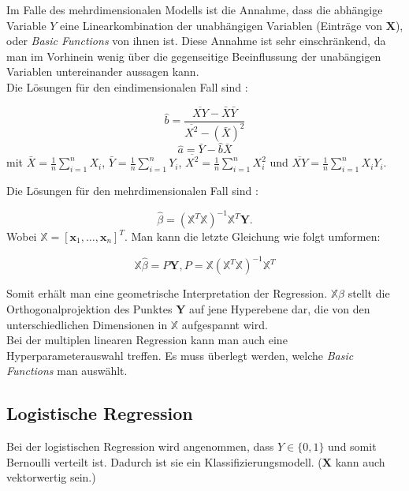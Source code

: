 Im Falle des mehrdimensionalen Modells ist die Annahme, dass die \glqq abh\"angige\grqq{} Variable $Y$ eine Linearkombination der \glqq unabh\"angigen\grqq{} Variablen
(Eintr\"age von $\mathbf{X}$), oder \textit{Basic Functions} von ihnen ist. Diese Annahme ist sehr einschr\"ankend, da man im Vorhinein wenig \"uber die gegenseitige Beeinflussung der 
\glqq unab\"angigen\grqq{} Variablen untereinander aussagen kann. \\

Die L\"osungen f\"ur den eindimensionalen Fall sind \cite{wasserman}:

$$ \hat{b} = \frac{\overline{XY} - \bar{X}\bar{Y}}{\overline{X^2} - (\bar{X})^2} $$
$$ \hat{a} = \bar{Y} - \hat{b}\bar{X} $$
mit $\bar{X} = \frac{1}{n} \sum_{i = 1}^n X_i$, $\bar{Y} = \frac{1}{n} \sum_{i = 1}^n Y_i$, $\overline{X^2} = \frac{1}{n} \sum_{i = 1}^n X_i^2$ und $\overline{XY} = \frac{1}{n} \sum_{i = 1}^n X_iY_i$.

Die L\"osungen f\"ur den mehrdimensionalen Fall sind \cite{wasserman}: 

$$  \hat{\beta} = (\mathbb{X}^T\mathbb{X})^{-1}\mathbb{X}^T\mathbf{Y} .$$
Wobei $\mathbb{X} = [\mathbf{x}_1, \dots, \mathbf{x}_n]^T$. Man kann die letzte Gleichung wie folgt umformen:

$$ \mathbb{X}\hat{\beta} = P\mathbf{Y}, P = \mathbb{X}(\mathbb{X}^T\mathbb{X})^{-1}\mathbb{X}^T $$

Somit erh\"alt man eine geometrische Interpretation der Regression. $\mathbb{X}\hat{\beta}$ stellt die Orthogonalprojektion des Punktes $\mathbf{Y}$ auf jene
Hyperebene dar, die von den unterschiedlichen Dimensionen in $\mathbb{X}$ aufgespannt wird. \\

Bei der multiplen linearen Regression kann man auch eine Hyperparameterauswahl treffen. Es muss \"uberlegt werden, welche 
\textit{Basic Functions} man ausw\"ahlt. 






























\subsection{Logistische Regression}
Bei der logistischen Regression wird angenommen, dass $Y \in \{0,1\}$ und somit Bernoulli verteilt ist.
Dadurch ist sie ein Klassifizierungsmodell. ($\mathbf{X}$ kann auch vektorwertig sein.)  \\

